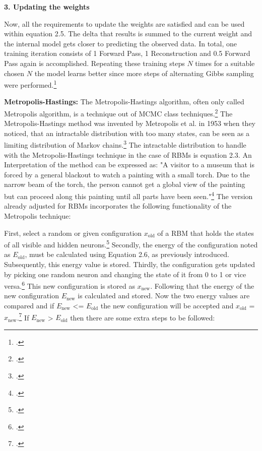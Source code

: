 \textbf{3. Updating the weights}

Now, all the requirements to update the weights are satisfied and can be used within equation 2.5. 
The delta that results is summed to the current weight and the internal model gets closer to predicting the observed data.
In total, one training iteration consists of 1 Forward Pass, 1 Reconstruction and 0.5 Forward Pass again is accomplished.
Repeating these training steps \( N \) times for a suitable chosen \( N \) the model learns better since more steps of alternating Gibbs sampling were performed.\footcite[cf.][6]{huembeliPhysicsEnergybasedModels2022}


\textbf{Metropolis-Hastings:} The Metropolis-Hastings algorithm, often only called Metropolis algorithm, is a technique out of \ac{MCMC} class techniques.\footcite[cf.][1]{patronOptimalRelaxationRate2024}
The Metropolis-Hastings method was invented by Metropolis et al. in 1953 when they noticed, that an intractable distribution with too many states, can be seen as a limiting distribution of Markov chains.\footcite[cf.][1087-1092]{metropolisEquationStateCalculations1953} 
The intractable distribution to handle with the Metropolis-Hastings technique in the case of \ac{RBM}s is equation 2.3.
An Interpretation of the method can be expressed as: "A visitor to a museum that is forced by a general blackout to watch
a painting with a small torch.
Due to the narrow beam of the torch, the person cannot get a global view of the painting but can proceed along this painting until all parts have been seen."\footcite[cf.][2]{robertMetropolisHastingsAlgorithm2016}
The version already adjusted for \ac{RBM}s incorporates the following functionality of the Metropolis technique:

First, select a random or given configuration $x_{\text{old}}$ of a \ac{RBM} that holds the states of all visible and hidden neurons.\footcite[cf.][65]{beichlMetropolisAlgorithm2000}
Secondly, the energy of the configuration noted as  $E_{\text{old}}$, must be calculated using Equation 2.6, as previously introduced. Subsequently, this energy value is stored.
Thirdly, the configuration gets updated by picking one random neuron and changing the state of it from 0 to 1 or vice versa.\footcite[cf.][1]{rosenthalOptimalProposalDistributions2009}
This new configuration is stored as $x_{\text{new}}$. Following that the energy of the new configuration $E_{\text{new}}$ is calculated and stored.
Now the two energy values are compared and if $E_{\text{new}}$ <= $E_{\text{old}}$ the new configuration will be accepted and $x_{\text{old}}$ = $x_{\text{new}}$.\footcite[cf.][1-2]{patronOptimalRelaxationRate2024}
If $E_{\text{new}}$ > $E_{\text{old}}$ then there are some extra steps to be followed: 


